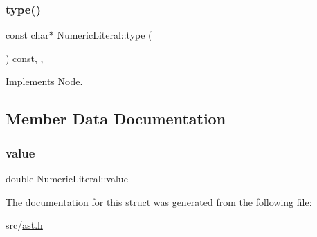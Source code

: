 \mbox{\label{struct_numeric_literal_a685ec9d2678a8fb5df8b4ec1a580b762}} 
\subsubsection{\texorpdfstring{type()}{type()}}
{\footnotesize\ttfamily const char$\ast$ Numeric\+Literal\+::type (\begin{DoxyParamCaption}{ }\end{DoxyParamCaption}) const\hspace{0.3cm}{\ttfamily [inline]}, {\ttfamily [override]}, {\ttfamily [virtual]}}



Implements \hyperlink{struct_node_a82f29420d0a38efcc370352528e94e9b}{Node}.



\subsection{Member Data Documentation}
\mbox{\label{struct_numeric_literal_adeef869e11ca886648a0ccb723dc6639}} 
\subsubsection{\texorpdfstring{value}{value}}
{\footnotesize\ttfamily double Numeric\+Literal\+::value}



The documentation for this struct was generated from the following file\+:\begin{DoxyCompactItemize}
\item 
src/\hyperlink{ast_8h}{ast.\+h}\end{DoxyCompactItemize}
